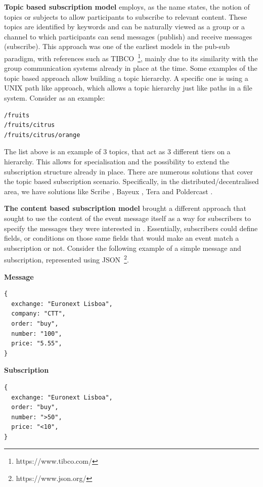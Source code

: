 \textbf{Topic based subscription model} employs, as the name states, the
notion of topics or subjects to allow participants to subscribe to
relevant content. These topics are identified by keywords and can be
naturally viewed as a group or a channel to which participants can send
messages (publish) and receive messages (subscribe). This approach was
one of the earliest models in the pub-sub paradigm, with references
such as TIBCO~\footnote{https://www.tibco.com/}, mainly due to its similarity with the group
communication systems already in place at the time. Some examples of the
topic based approach allow building a topic hierarchy. A specific one is
using a UNIX path like approach, which allows a topic hierarchy
just like paths in a file system. Consider as an example:

\begin{verbatim}
/fruits
/fruits/citrus
/fruits/citrus/orange
\end{verbatim}

The list above is an example of 3 topics, that act as 3 different tiers
on a hierarchy. This allows for specialisation and the possibility to
extend the subscription structure already in place. There are numerous
solutions that cover the topic based subscription scenario. Specifically,
in the distributed/decentralised area, we have solutions like Scribe \cite{Castro2002},
Bayeux \cite{Zhuang2001}, Tera \cite{Baldoni2007} and Poldercast \cite{Setty2012}.
\bigskip

\textbf{The content based subscription model} brought a different
approach that sought to use the content of the event message itself as a
way for subscribers to specify the messages they were interested in \cite{Banavar1999}.
Essentially, subscribers could define fields, or conditions on those same fields that would make an event
match a subscription or not. Consider the following example of a simple
message and subscription, represented using JSON~\footnote{https://www.json.org/}.
\bigskip

\textbf{Message}

\begin{verbatim}
{
  exchange: "Euronext Lisboa",
  company: "CTT",
  order: "buy",
  number: "100",
  price: "5.55",
}
\end{verbatim}

\textbf{Subscription}

\begin{verbatim}
{
  exchange: "Euronext Lisboa",
  order: "buy",
  number: ">50",
  price: "<10",
}
\end{verbatim}

